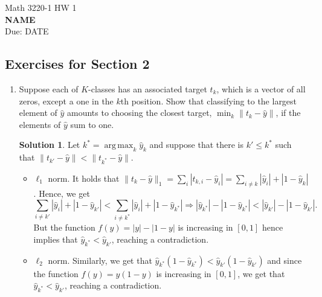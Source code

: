 \documentclass[]{book}
\theoremstyle{definition}
\newtheorem*{soln}{Solution}
\DeclareMathOperator*{\argmax}{arg\,max}
\begin{document}
\begin{center}
	{\Large Math 3220-1 \hspace{0.5cm} HW 1}\\
	\textbf{NAME}\\ %
	Due: DATE %
\end{center}

\vspace{0.2 cm}


\subsection*{Exercises for Section 2}

\begin{enumerate}
	\item\label{ex:k-classes} Suppose each of $K$-classes has an associated
	target $t_k$, which is a vector of all zeros, except a one in the $k$th
	position. Show that classifying to the largest element of $\hat{y}$ amounts
	to choosing the closest target, $\min_k\|t_k-\hat{y}\|$, if the elements of
	$\hat{y}$ sum to one.
	\begin{soln}
		\newcommand{\normone}[1]{\sum_{i\ne #1}|\hat{y}_i|+|1-\hat{y}_{#1}|} Let
		$k^*=\argmax_k \hat{y}_k$ and suppose that there is $k'\le k^*$ such
		that $\|t_{k'}-\hat{y}\| < \|t_{k^*}-\hat{y}\|$.
		\begin{itemize}
			\item $\ell_1$ norm. It holds that
			      $\|t_k-\hat{y}\|_1=\sum_i|t_{k,i}-\hat{y}_i|=\sum_{i\ne
					      k}|\hat{y}_i|+|1-\hat{y}_k|$. Hence, we get
			      \begin{equation}\label{2.1-inequality}
				      \normone{k'} < \normone{k^*}\Rightarrow |\hat{y}_{k^*}|-|1-\hat{y}_{k^*}|
				      < |\hat{y}_{k'}|-|1-\hat{y}_{k'}|.
			      \end{equation}
			      But the function $f(y)=|y|-|1-y|$ is increasing in $[0,1]$
			      hence~ implies that
			      $\hat{y}_{k^*}<\hat{y}_{k'}$, reaching a contradiction.
			\item $\ell_2$ norm. Similarly, we get that
			      $\hat{y}_{k^*}(1-\hat{y}_{k^*})<\hat{y}_{k'}(1-\hat{y}_{k'})$
			      and since the function $f(y)=y(1-y)$ is increasing in $[0,1]$,
			      we get that $\hat{y}_{k^*}<\hat{y}_{k'}$, reaching a
			      contradiction.
		\end{itemize}
	\end{soln}


\end{enumerate}
\end{document}
